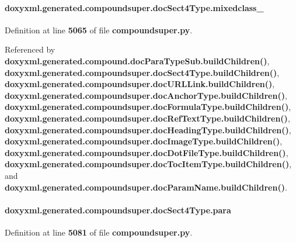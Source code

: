 \paragraph[{mixedclass\+\_\+}]{\setlength{\rightskip}{0pt plus 5cm}doxyxml.\+generated.\+compoundsuper.\+doc\+Sect4\+Type.\+mixedclass\+\_\+}\label{classdoxyxml_1_1generated_1_1compoundsuper_1_1docSect4Type_a5e7c6f55977b6075c46063db1801e3bd}


Definition at line {\bf 5065} of file {\bf compoundsuper.\+py}.



Referenced by {\bf doxyxml.\+generated.\+compound.\+doc\+Para\+Type\+Sub.\+build\+Children()}, {\bf doxyxml.\+generated.\+compoundsuper.\+doc\+Sect4\+Type.\+build\+Children()}, {\bf doxyxml.\+generated.\+compoundsuper.\+doc\+U\+R\+L\+Link.\+build\+Children()}, {\bf doxyxml.\+generated.\+compoundsuper.\+doc\+Anchor\+Type.\+build\+Children()}, {\bf doxyxml.\+generated.\+compoundsuper.\+doc\+Formula\+Type.\+build\+Children()}, {\bf doxyxml.\+generated.\+compoundsuper.\+doc\+Ref\+Text\+Type.\+build\+Children()}, {\bf doxyxml.\+generated.\+compoundsuper.\+doc\+Heading\+Type.\+build\+Children()}, {\bf doxyxml.\+generated.\+compoundsuper.\+doc\+Image\+Type.\+build\+Children()}, {\bf doxyxml.\+generated.\+compoundsuper.\+doc\+Dot\+File\+Type.\+build\+Children()}, {\bf doxyxml.\+generated.\+compoundsuper.\+doc\+Toc\+Item\+Type.\+build\+Children()}, and {\bf doxyxml.\+generated.\+compoundsuper.\+doc\+Param\+Name.\+build\+Children()}.

\paragraph[{para}]{\setlength{\rightskip}{0pt plus 5cm}doxyxml.\+generated.\+compoundsuper.\+doc\+Sect4\+Type.\+para}\label{classdoxyxml_1_1generated_1_1compoundsuper_1_1docSect4Type_a6a88184a45cb0b76a97a70b5b001b585}


Definition at line {\bf 5081} of file {\bf compoundsuper.\+py}.



